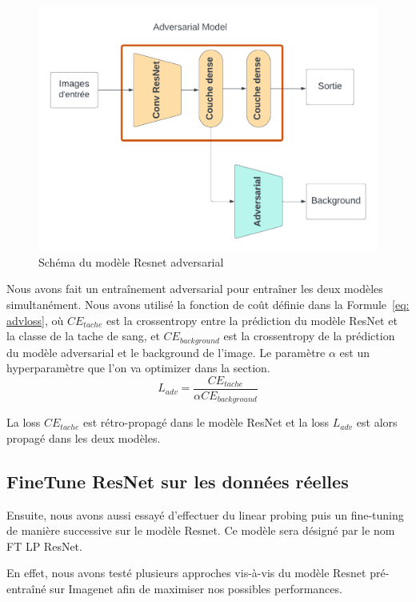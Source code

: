 \documentclass[a4paper]{article}
\begin{document}
\begin{figure}[ht]
    \centering
    \includegraphics[width=1\linewidth]{../asset/Resnet_adv.png}
    \caption{Schéma du modèle Resnet adversarial}
    \label{fig:resnet_adv}
\end{figure}

Nous avons fait un entraînement adversarial pour entraîner les deux modèles simultanément. Nous avons utilisé la fonction de coût définie dans la Formule~\ref{eq: advloss}, où $CE_{tache}$ est la crossentropy entre la prédiction du modèle ResNet et la classe de la tache de sang, et $CE_{background}$ est la crossentropy de la prédiction du modèle adversarial et le background de l'image. Le paramètre $\alpha$ est un hyperparamètre que l'on va optimizer dans la section.
\begin{equation}
    L_{adv} = \frac{CE_{tache}}{\alpha CE_{background}}
    \label{eq: advloss}
\end{equation}

La loss $CE_{tache}$ est rétro-propagé dans le modèle ResNet et la loss $L_{adv}$ est alors propagé dans les deux modèles.

\subsection{FineTune ResNet sur les données réelles}
Ensuite, nous avons aussi essayé d'effectuer du linear probing puis un fine-tuning de manière successive sur le modèle Resnet. Ce modèle sera désigné par le nom FT LP ResNet. 

En effet, nous avons testé plusieurs approches vis-à-vis du modèle Resnet pré-entraîné sur Imagenet afin de maximiser nos possibles performances. 
\end{document}
